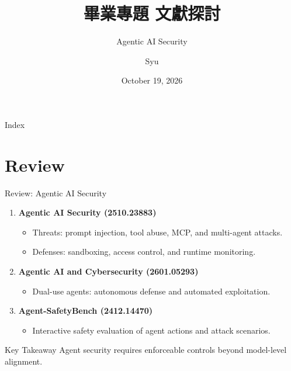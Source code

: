 \documentclass[aspectratio=169]{beamer}
\title[第三次雙周會]{畢業專題 文獻探討}
\subtitle{Agentic AI Security}
\author{Syu}
\date{October 19, 2026}
\begin{document}
\newcommand{\paperref}[1]{\vfill {\tiny\color{myDarkgray} arXiv: #1}}

\begin{frame}
    \titlepage
\end{frame}

\begin{frame}{Index}
    \tableofcontents
\end{frame}

\section{Review}
\begin{frame}{Review: Agentic AI Security}
    \begin{enumerate}
        \item \textbf{Agentic AI Security (2510.23883)}
            \begin{itemize}
                \item Threats: prompt injection, tool abuse, MCP, and multi-agent attacks.
                \item Defenses: sandboxing, access control, and runtime monitoring.
            \end{itemize}
        \item \textbf{Agentic AI and Cybersecurity (2601.05293)}
            \begin{itemize}
                \item Dual-use agents: autonomous defense and automated exploitation.
            \end{itemize}
        \item \textbf{Agent-SafetyBench (2412.14470)}
            \begin{itemize}
                \item Interactive safety evaluation of agent actions and attack scenarios.
            \end{itemize}
    \end{enumerate}
    \begin{block}{Key Takeaway}
        Agent security requires enforceable controls beyond model-level alignment.
    \end{block}
\end{frame}
\end{document}
